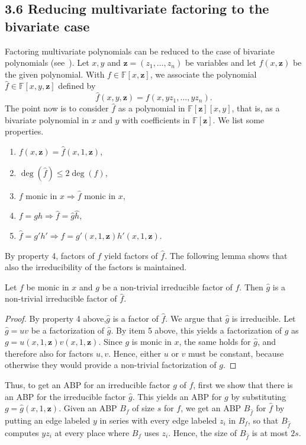 \subsection*{3.6 Reducing multivariate factoring to the bivariate case}
Factoring multivariate polynomials can be reduced to the case of bivariate polynomials (see~\cite{ref12}). Let $x,y$ and $\mathbf z=(z_1,\ldots,z_n)$ be variables and let $f(x,\mathbf z)$ be the given polynomial. With $f\in\mathbb F[x,\mathbf z]$, we associate the polynomial $\widehat f\in\mathbb F[x,y,\mathbf z]$ defined by
\[\widehat f(x,y,\mathbf z)=f(x,yz_1,\ldots,yz_n).\]
The point now is to consider $\widehat f$ as a polynomial in $\mathbb F[\mathbf z][x,y]$, that is, as a bivariate polynomial in $x$ and $y$ with coefficients in $\mathbb F[\mathbf z]$. We list some properties.
\begin{enumerate}\item $f(x,\mathbf z)=\widehat f(x,1,\mathbf z)$,\item $\deg(\widehat f)\leq2\deg(f)$,\item $f\text{ monic in }x\Longrightarrow\widehat f\text{ monic in }x$,\item $f=gh\Longrightarrow\widehat f=\widehat g\widehat h$,\item $\widehat f=g'h'\Longrightarrow f=g'(x,1,\mathbf z)h'(x,1,\mathbf z)$.\end{enumerate}
By property 4, factors of $f$ yield factors of $\widehat f$. The following lemma shows that also the irreducibility of the factors is maintained.
\begin{ntlemma}
Let $f$ be monic in $x$ and $g$ be a non-trivial irreducible factor of $f$. Then $\widehat g$ is a non-trivial irreducible factor of $\widehat f$.
\end{ntlemma}
\begin{proof}
By property 4 above,$\widehat g$ is a factor of $\widehat f$. We argue that $\widehat g$ is irreducible.
Let $\widehat g=uv$ be a factorization of $\widehat g$. By item 5 above, this yields a factorization of $g$ as $g=u(x,1,\mathbf z)v(x,1,\mathbf z)$. Since $g$ is monic in $x$, the same holds for $\widehat g$, and therefore also for factors $u,v$. Hence, either $u$ or $v$ must be constant, because otherwise they would provide a non-trivial factorization of $g$.
\end{proof}
Thus, to get an ABP for an irreducible factor $g$ of $f$, first we show that there is an ABP for the irreducible factor $\widehat g$. This yields an ABP for $g$ by substituting $g=\widehat g(x,1,\mathbf z)$.
Given an ABP $B_f$ of size $s$ for $f$, we get an ABP $B_{\widehat f}$ for $\widehat f$ by putting an edge labeled $y$ in series with every edge labeled $z_i$ in $B_f$, so that $B_{\widehat f}$ computes $yz_i$ at every place where $B_f$ uses $z_i$. Hence, the size of $B_{\widehat f}$ is at most $2s$.
